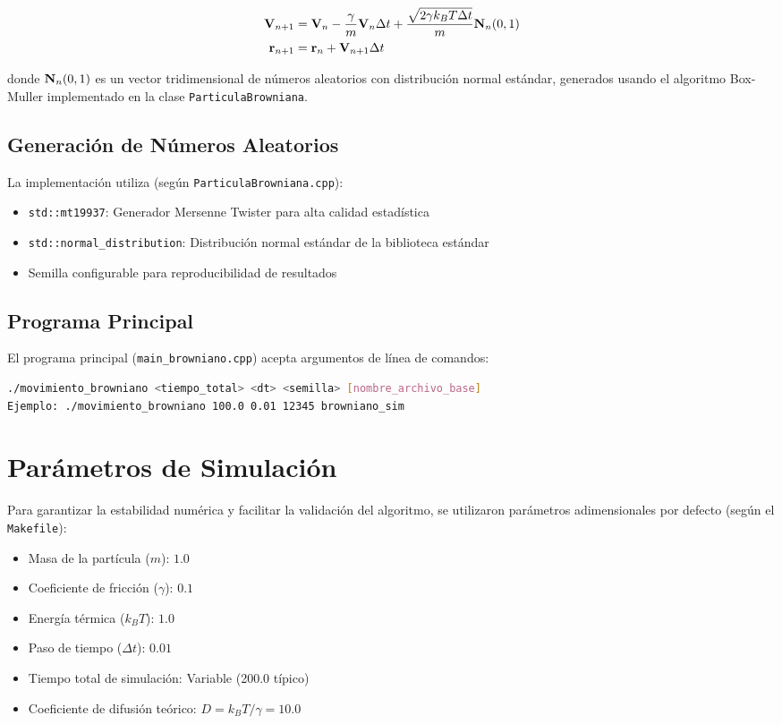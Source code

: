 \documentclass[11pt,a4paper]{article}
\begin{document}
\begin{align}
    \vb{V}_{n+1} &= \vb{V}_n - \frac{\gamma}{m}\vb{V}_n \Delta t + \frac{\sqrt{2\gamma k_B T \Delta t}}{m} \vb{N}_n(0,1) \\
    \vb{r}_{n+1} &= \vb{r}_n + \vb{V}_{n+1} \Delta t
\end{align}

donde $\vb{N}_n(0,1)$ es un vector tridimensional de números aleatorios con distribución normal estándar, generados usando el algoritmo Box-Muller implementado en la clase \texttt{ParticulaBrowniana}.

\subsection{Generación de Números Aleatorios}
La implementación utiliza (según \texttt{ParticulaBrowniana.cpp}):
\begin{itemize}
    \item \texttt{std::mt19937}: Generador Mersenne Twister para alta calidad estadística
    \item \texttt{std::normal\_distribution}: Distribución normal estándar de la biblioteca estándar
    \item Semilla configurable para reproducibilidad de resultados
\end{itemize}

\subsection{Programa Principal}
El programa principal (\texttt{main\_browniano.cpp}) acepta argumentos de línea de comandos:
\begin{lstlisting}[language=bash]
./movimiento_browniano <tiempo_total> <dt> <semilla> [nombre_archivo_base]
Ejemplo: ./movimiento_browniano 100.0 0.01 12345 browniano_sim
\end{lstlisting}

\section{Parámetros de Simulación}

Para garantizar la estabilidad numérica y facilitar la validación del algoritmo, se utilizaron parámetros adimensionales por defecto (según el \texttt{Makefile}):

\begin{itemize}
    \item Masa de la partícula ($m$): $1.0$
    \item Coeficiente de fricción ($\gamma$): $0.1$
    \item Energía térmica ($k_B T$): $1.0$
    \item Paso de tiempo ($\Delta t$): $0.01$
    \item Tiempo total de simulación: Variable (200.0 típico)
    \item Coeficiente de difusión teórico: $D = k_B T / \gamma = 10.0$
\end{itemize}
\end{document}
